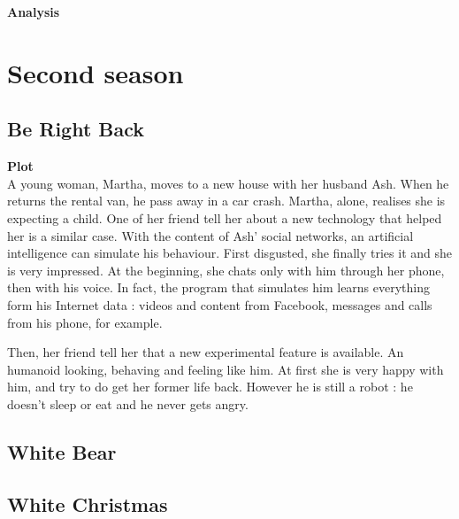 \documentclass{article}
\begin{document}
\textbf{Analysis}\\

\section{Second season}

\subsection{Be Right Back}
\textbf{Plot}\\
A young woman, Martha, moves to a new house with her husband Ash. When he returns the rental van, he pass away in a car crash. Martha, alone, realises she is expecting a child. One of her friend tell her about a new technology that helped her is a similar case. With the content of Ash' social networks, an artificial intelligence can simulate his behaviour. First disgusted, she finally tries it and she is very impressed. At the beginning, she chats only with him through her phone, then with his voice. In fact, the program that simulates him learns everything form his Internet data : videos and content from Facebook, messages and calls from his phone, for example.

Then, her friend tell her that a new experimental feature is available. An humanoid looking, behaving and feeling like him. At first she is very happy with him, and try to do get her former life back. However he is still a robot : he doesn't sleep or eat and he never gets angry.





\subsection{White Bear}
\subsection{White Christmas}
\end{document}
